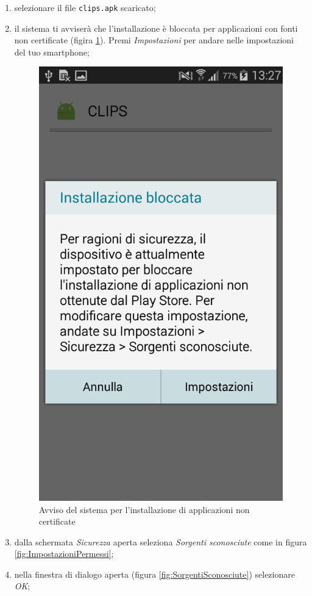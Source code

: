\documentclass[../ClipsManualeUtente.tex]{subfiles}
\begin{document}
			\begin{enumerate}
				\item selezionare il file \lstinline|clips.apk| scaricato;
				\item il sistema ti avviserà che l'installazione è bloccata per applicazioni con fonti non certificate (figira \ref{fig:InstallazioneBloccata}). Premi \textit{Impostazioni} per andare nelle impostazioni del tuo smartphone;
				
				\begin{figure}[h]
					\centering
					\includegraphics[scale=0.2]{img/InstallazioneBloccata}
					\caption{Avviso del sistema per l'installazione di applicazioni non certificate}
					\label{fig:InstallazioneBloccata}
				\end{figure}
				
				\item dalla schermata \textit{Sicurezza} aperta seleziona \textit{Sorgenti sconosciute} come in figura \ref{fig:ImpostazioniPermessi};
				\item nella finestra di dialogo aperta (figura \ref{fig:SorgentiSconosciute}) selezionare \textit{OK};
				\end{enumerate}	
				
\end{document}
